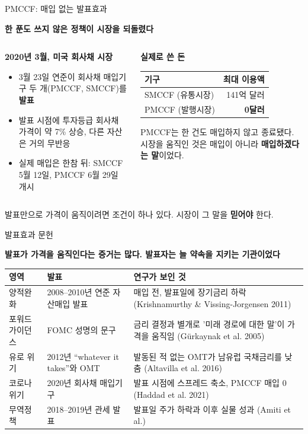 \documentclass[aspectratio=169,9pt,t]{beamer}
\newcommand{\msg}[1]{{\fontsize{11.5}{15}\selectfont\bfseries\color{navy}\RaggedRight #1\par}\vspace{2.0mm}}
\newcommand{\takeaway}[1]{%
  \par\vfill
  \noindent\colorbox{wash}{\begin{minipage}[c]{\dimexpr\linewidth-2\fboxsep\relax}\vspace{0.5mm}\hspace{1.5mm}{\color{crim}\bfseries$\rightarrow$}\hspace{1.5mm}%
  \begin{minipage}[c]{\dimexpr\linewidth-9mm\relax}\fontsize{8.6}{11}\selectfont\RaggedRight #1\end{minipage}\vspace{0.5mm}\end{minipage}}\par\vspace{0.8mm}}
\newcommand{\lab}[1]{{\fontsize{8.4}{10.5}\selectfont\bfseries\color{crim}#1}}
\renewcommand{\arraystretch}{1.3}
\newcommand{\tf}{\fontsize{8.2}{10.4}\selectfont}
\newcommand{\tfs}{\fontsize{7.5}{9.4}\selectfont\renewcommand{\arraystretch}{1.18}}
\begin{document}
\begin{frame}{PMCCF: 매입 없는 발표효과}
\msg{한 푼도 쓰지 않은 정책이 시장을 되돌렸다}
\begin{columns}[T,onlytextwidth]
\begin{column}{0.53\textwidth}
\lab{2020년 3월, 미국 회사채 시장}
\begin{itemize}
\item 3월 23일 연준이 회사채 매입기구 두 개(PMCCF, SMCCF)를 \textbf{발표}
\item 발표 시점에 투자등급 회사채 가격이 약 7\% 상승, 다른 자산은 거의 무반응
\item 실제 매입은 한참 뒤: SMCCF 5월 12일, PMCCF 6월 29일 개시
\end{itemize}
\end{column}
\begin{column}{0.42\textwidth}
\lab{실제로 쓴 돈}\par\vspace{1.5mm}
\begingroup\tf
\begin{tabularx}{\linewidth}{@{}Yr@{}}
\toprule
기구 & 최대 이용액\\
\midrule
SMCCF (유통시장) & 141억 달러\\
PMCCF (발행시장) & \textbf{0달러}\\
\bottomrule
\end{tabularx}\endgroup
\vspace{2.5mm}
{\small\RaggedRight PMCCF는 한 건도 매입하지 않고 종료됐다. 시장을 움직인 것은 매입이 아니라 \textbf{매입하겠다는 말}이었다.\par}
\end{column}
\end{columns}
\takeaway{발표만으로 가격이 움직이려면 조건이 하나 있다. 시장이 그 말을 \textbf{믿어야} 한다.}
\end{frame}

\begin{frame}{발표효과 문헌}
\msg{발표가 가격을 움직인다는 증거는 많다. 발표자는 늘 약속을 지키는 기관이었다}
\begingroup\tfs
\begin{tabularx}{\textwidth}{@{}L{0.2\textwidth}L{0.34\textwidth}Y@{}}
\toprule
영역 & 발표 & 연구가 보인 것\\
\midrule
양적완화 & 2008--2010년 연준 자산매입 발표 & 매입 전, 발표일에 장기금리 하락 (Krishnamurthy \& Vissing-Jorgensen 2011)\\
포워드 가이던스 & FOMC 성명의 문구 & 금리 결정과 별개로 '미래 경로에 대한 말'이 가격을 움직임 (Gürkaynak et al. 2005)\\
유로 위기 & 2012년 ``whatever it takes''와 OMT & 발동된 적 없는 OMT가 남유럽 국채금리를 낮춤 (Altavilla et al. 2016)\\
코로나 위기 & 2020년 회사채 매입기구 & 발표 시점에 스프레드 축소, PMCCF 매입 0 (Haddad et al. 2021)\\
무역정책 & 2018--2019년 관세 발표 & 발표일 주가 하락과 이후 실물 성과 (Amiti et al.)\\
\bottomrule
\end{tabularx}\endgroup
\end{frame}
\end{document}
